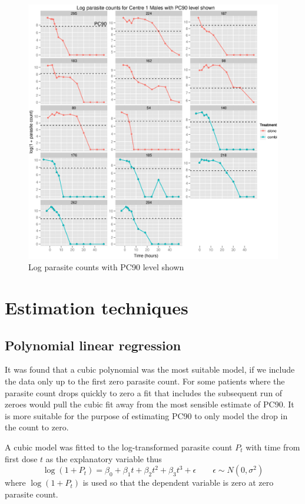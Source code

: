 \begin{figure}[p]
\begin{center}
\includegraphics[width=6.1in]{log901M.eps}
\caption{Log parasite counts with PC90 level shown}
\label{log901M}
\end{center}
\end{figure}
\section{Estimation techniques}
\subsection{Polynomial linear regression}
It was found that a cubic polynomial was the most suitable model, if we include the data only up to the first zero parasite count. For some patients where the parasite count drops quickly to zero a fit that includes the subsequent run of zeroes would pull the cubic fit away from the most sensible estimate of PC90. It is more suitable for the purpose of estimating PC90 to only model the drop in the count to zero.

A cubic model was fitted to the log-transformed parasite count $P_{t}$ with time from first dose $t$ as the explanatory variable thus
$$\log(1+P_{t})=\beta_0+\beta_1t+\beta_2t^2+\beta_3t^3+\epsilon\quad\quad\epsilon\sim N(0,\sigma^2)$$
where $\log(1+P_{t})$ is used so that the dependent variable is zero at zero parasite count.

